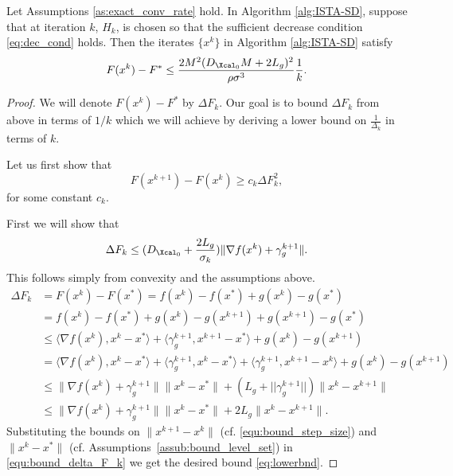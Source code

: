 \documentclass[11pt]{article}
\numberwithin{equation}{section}
\begin{document}
\begin{theorem}\label{the:ISTA-SD}
Let Assumptions \ref{as:exact_conv_rate} hold. In Algorithm \ref{alg:ISTA-SD}, suppose that at iteration $k$,  $H_k$, is chosen so that the sufficient decrease condition \eqref{eq:dec_cond} holds.
Then the iterates $\{x^k\}$ in Algorithm \ref{alg:ISTA-SD} satisfy
\begin{align}
    \label{the:ISTA-nonsmooth-conclude} 
    F(x^k)-F^* \leq  \frac{2M^2 (D_{\Xcal_0} M+2L_g)^2}{\rho\sigma^3}\frac{1}{k}.
\end{align}
\end{theorem}
\begin{proof}
	We will denote $F(x^k)-F^*$ by $\Delta F_k$.  Our goal is to bound $\Delta F_k$ from above  in terms of $1/k$ which we will achieve by deriving a lower bound  on $\frac{1}{\Delta_k}$ in terms of $k$. 

	Let us first show that 
	\begin{equation}\label{eq:mainbnd}
	F(x^{k+1})-F(x^k)\geq c_k \Delta F_k^2,
	\end{equation}
	for some constant $c_k$. 

	First we will show that 
	\begin{equation}\label{eq:lowerbnd}
	\Delta F_k\leq (D_{\Xcal_0}+\frac{2L_g}{\sigma_k}) \|\nabla f(x^k)+\gamma_g^{k+1}\|.
	\end{equation}
	This follows simply from convexity and the assumptions above.
	\begin{align}
	 \Delta F_k
	 \nonumber
	 &=F(x^k)-F(x^*)=f(x^k)-f(x^*)+g(x^k)-g(x^*) \\
	 \nonumber
	 &=f(x^k)-f(x^*)+g(x^k)-g(x^{k+1})+g(x^{k+1})-g(x^*) \\
	 \nonumber
	 &\leq \langle \nabla f(x^k), x^k-x^* \rangle
	 +\langle \gamma_g^{k+1}, x^{k+1}-x^* \rangle 
	 +g(x^k)-g(x^{k+1}) \\
	 \nonumber
	 &= \langle \nabla f(x^k), x^k-x^* \rangle
	 +\langle \gamma_g^{k+1}, x^k-x^* \rangle 
	 +\langle \gamma_g^{k+1}, x^{k+1}-x^k \rangle 
	 +g(x^k)-g(x^{k+1})\\
	 \nonumber
	 &\leq \|\nabla f(x^k)+\gamma_g^{k+1}\|\|x^k-x^*\| 
	 + (L_g + ||\gamma_g^{k+1}||) \|x^k-x^{k+1}\| \\
	 \label{equ:bound_delta_F_k}
	 &\leq \|\nabla f(x^k)+\gamma_g^{k+1}\|\|x^k-x^*\| 
	 + 2L_g \|x^k-x^{k+1}\|. 
	\end{align}
	Substituting the bounds on  $\| x^{k+1} - x^k\|$ (cf. \eqref{equ:bound_step_size}) and   $\| x^{k} - x^*\|$ (cf. Assumptions~\ref{assub:bound_level_set})
	in \eqref{equ:bound_delta_F_k} we get
	the desired bound \eqref{eq:lowerbnd}.  


\end{proof}
\end{document}
